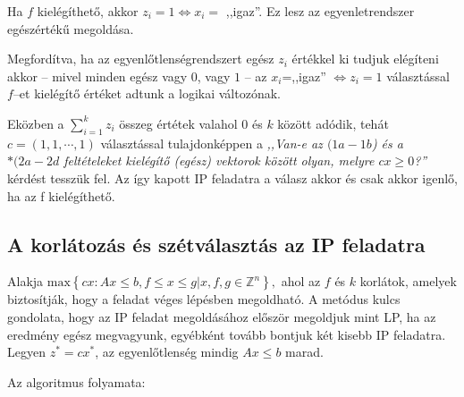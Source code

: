 Ha $f$ kielégíthető, akkor $z_i=1 \Leftrightarrow x_i=$ ,,igaz''. Ez lesz az
egyenletrendszer egészértékű megoldása. 

Megfordítva, ha az egyenlőtlenségrendszert egész $z_i$ értékkel ki tudjuk
elégíteni akkor -- mivel minden egész vagy $0$, vagy $1$ -- az $x_i$=,,igaz''
$\Leftrightarrow z_i=1$ választással $f$--et kielégítő értéket adtunk a logikai
változónak.

Eközben a $\sum_{i=1}^{k}{z_i}$ összeg értétek valahol $0$ és $k$ között adódik,
tehát $c=(1,1,\cdots,1)$ választással tulajdonképpen a \emph{,,Van-e az
$(1a-1b$) és a $*(2a-2d$ feltételeket kielégítő (egész) vektorok között olyan,
melyre $cx \geq 0$?''} kérdést tesszük fel. Az így kapott IP feladatra a válasz
akkor és csak akkor igenlő, ha az f kielégíthető.

\subsection{A korlátozás és szétválasztás az IP feladatra}

Alakja $\mbox{max} \left\{cx:Ax \leq b, f \leq x \leq g| x,f,g \in \mathbb{Z}^n
\right\},$ ahol az $f$ és $k$ korlátok, amelyek biztosítják, hogy a feladat véges
lépésben megoldható. A metódus kulcs gondolata, hogy az IP feladat megoldásához először
megoldjuk mint LP, ha az eredmény egész megvagyunk, egyébként tovább bontjuk két kisebb
IP feladatra. Legyen $z^*=cx^*$, az egyenlőtlenség mindig $Ax \leq b$ marad.

Az algoritmus folyamata:

